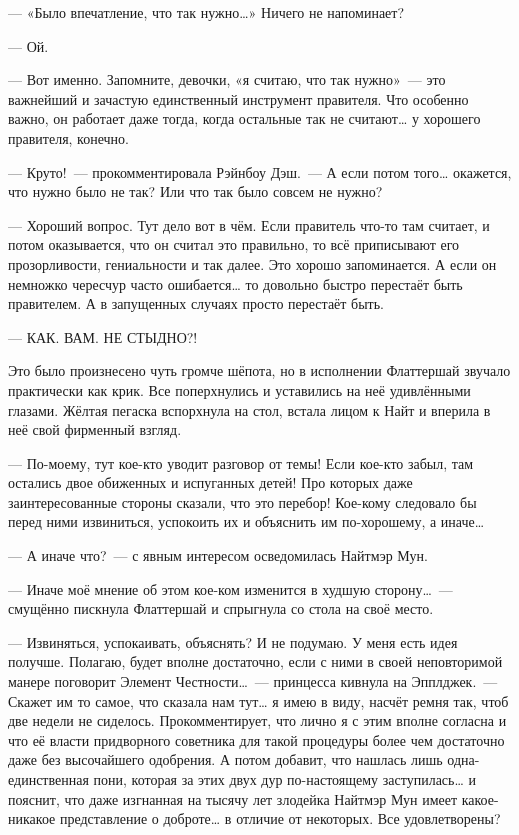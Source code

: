 \documentclass[twoside,a5paper,12pt]{extbook}
\begin{document}
 — «Было впечатление, что так нужно…» Ничего не напоминает?
 
 — Ой.
 
 — Вот именно. Запомните, девочки, «я считаю, что так нужно» — это важнейший и зачастую единственный инструмент правителя. Что особенно важно, он работает даже тогда, когда остальные так не считают… у хорошего правителя, конечно.
 
 — Круто! — прокомментировала Рэйнбоу Дэш. — А если потом того… окажется, что нужно было не так? Или что так было совсем не нужно?
 
 — Хороший вопрос. Тут дело вот в чём. Если правитель что-то там считает, и потом оказывается, что он считал это правильно, то всё приписывают его прозорливости, гениальности и так далее. Это хорошо запоминается. А если он немножко чересчур часто ошибается… то довольно быстро перестаёт быть правителем. А в запущенных случаях просто перестаёт быть.
 
 — КАК. ВАМ. НЕ СТЫДНО?!
 
Это было произнесено чуть громче шёпота, но в исполнении Флаттершай звучало практически как крик. Все поперхнулись и уставились на неё удивлёнными глазами. Жёлтая пегаска вспорхнула на стол, встала лицом к Найт и вперила в неё свой фирменный взгляд.

— По-моему, тут кое-кто уводит разговор от темы! Если кое-кто забыл, там остались двое обиженных и испуганных детей! Про которых даже заинтересованные стороны сказали, что это перебор! Кое-кому следовало бы перед ними извиниться, успокоить их и объяснить им по-хорошему, а иначе…

— А иначе что? — с явным интересом осведомилась Найтмэр Мун.

— Иначе моё мнение об этом кое-ком изменится в худшую сторону… — смущённо пискнула Флаттершай и спрыгнула со стола на своё место.

— Извиняться, успокаивать, объяснять? И не подумаю. У меня есть идея получше. Полагаю, будет вполне достаточно, если с ними в своей неповторимой манере поговорит Элемент Честности… — принцесса кивнула на Эпплджек. — Скажет им то самое, что сказала нам тут… я имею в виду, насчёт ремня так, чтоб две недели не сиделось. Прокомментирует, что лично я с этим вполне согласна и что её власти придворного советника для такой процедуры более чем достаточно даже без высочайшего одобрения. А потом добавит, что нашлась лишь одна-единственная пони, которая за этих двух дур по-настоящему заступилась… и пояснит, что даже изгнанная на тысячу лет злодейка Найтмэр Мун имеет какое-никакое представление о доброте… в отличие от некоторых. Все удовлетворены?
\end{document}
